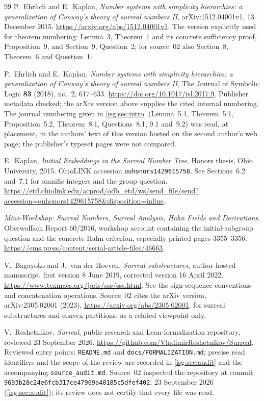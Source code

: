 \documentclass[11pt]{article}
\theoremstyle{definition}
\theoremstyle{remark}
\begin{document}
\clearpage
{}
{}
\begin{thebibliography}{99}
P.~Ehrlich and E.~Kaplan,
\emph{Number systems with simplicity hierarchies: a generalization of
Conway's theory of surreal numbers II},
arXiv:1512.04001v1, 13 December 2015.
\url{https://arxiv.org/abs/1512.04001v1}.
The version explicitly used for theorem numbering: Lemma~3,
Theorem~1 and its concrete sufficiency proof, Proposition~9,
and Section~9, Question~2; for source~02 also Section~8, Theorem~6 and
Question~1.

P.~Ehrlich and E.~Kaplan,
\emph{Number systems with simplicity hierarchies: a generalization of
Conway's theory of surreal numbers II},
The Journal of Symbolic Logic \textbf{83} (2018), no.~2, 617--633.
\url{https://doi.org/10.1017/jsl.2017.9}.
Publisher metadata checked; the arXiv version above supplies the cited
internal numbering. The journal numbering given in \cref{isg:sec:intro}
(Lemma~5.1, Theorem~5.1, Proposition~5.2, Theorem~8.1, Questions~8.1,
9.1 and~9.2) was
read, at placement, in the authors' text of this version hosted on the
second author's web page; the publisher's typeset pages were not
compared.

E.~Kaplan,
\emph{Initial Embeddings in the Surreal Number Tree},
Honors thesis, Ohio University, 2015.
OhioLINK accession \texttt{ouhonors1429615758}.
See Sections~6.2 and~7.1 for omnific integers and the group question.
\url{https://etd.ohiolink.edu/acprod/odb_etd/ws/send_file/send?accession=ouhonors1429615758&disposition=inline}.

\emph{Mini-Workshop: Surreal Numbers, Surreal Analysis, Hahn Fields
and Derivations}, Oberwolfach Report 60/2016,
workshop account containing the initial-subgroup question and the
concrete Hahn criterion, especially printed pages 3355--3356.
\url{https://ems.press/content/serial-article-files/46663}.

V.~Bagayoko and J.~van der Hoeven,
\emph{Surreal substructures}, author-hosted manuscript,
first version 8 June 2019, corrected version 16 April 2022.
\url{https://www.texmacs.org/joris/sss/sss.html}.
See the sign-sequence conventions and concatenation operations.
Source~02 cites the arXiv version, arXiv:2305.02001 (2023),
\url{https://arxiv.org/abs/2305.02001}, for surreal substructures and
convex partitions, as a related viewpoint only.

V.~Reshetnikov,
\emph{Surreal}, public research and Lean-formalization repository,
reviewed 23 September 2026.
\url{https://github.com/VladimirReshetnikov/Surreal}.
Reviewed entry points: \texttt{README.md} and
\texttt{docs/FORMALIZATION.md}; precise read identifiers and the scope
of the review are recorded in \cref{isg:sec:audit} and the accompanying
\texttt{source\_audit.md}. Source~02 inspected the repository at commit
\texttt{9693b28c24e6fcb317ce47969a40185c5dfef402}, 23 September 2026
(\cref{isg:sec:audit}); its review does not certify that every file was
read.


\end{thebibliography}
\end{document}
